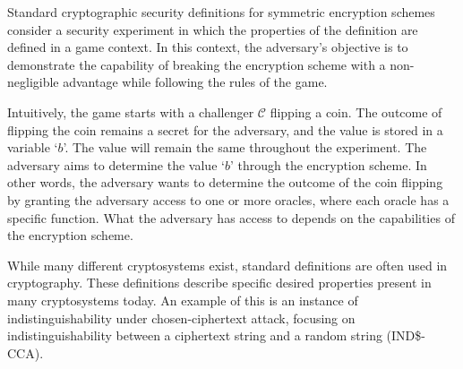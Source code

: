 Standard cryptographic security definitions for symmetric encryption schemes consider a security experiment in which the properties of the definition are defined in a game context. In this context, the adversary's objective is to demonstrate the capability of breaking the encryption scheme with a non-negligible advantage while following the rules of the game.

Intuitively, the game starts with a challenger $\mathcal{C}$ flipping a coin. The outcome of flipping the coin remains a secret for the adversary, and the value is stored in a variable `$b$'. The value will remain the same throughout the experiment. The adversary aims to determine the value `$b$' through the encryption scheme. In other words, the adversary wants to determine the outcome of the coin flipping by granting the adversary access to one or more oracles, where each oracle has a specific function. What the adversary has access to depends on the capabilities of the encryption scheme.

While many different cryptosystems exist, standard definitions are often used in cryptography. These definitions describe specific desired properties present in many cryptosystems today. An example of this is an instance of indistinguishability under chosen-ciphertext attack, focusing on indistinguishability between a ciphertext string and a random string (IND\$-CCA).

